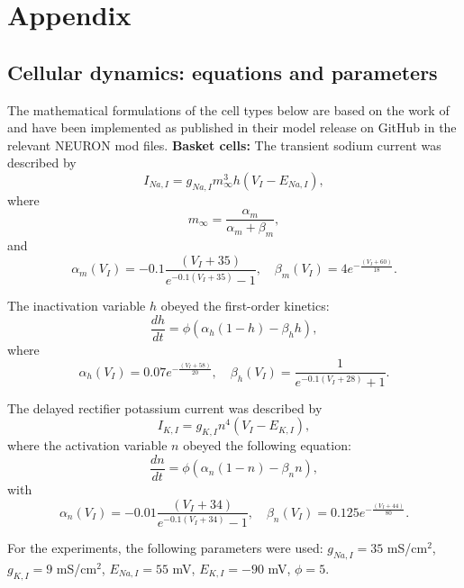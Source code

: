 \chapter{Appendix}\label{ch:appendix}
\section{Cellular dynamics: equations and parameters}
The mathematical formulations of the cell types below are based on the work of
\textcite{sanjayImpairedDendriticInhibition2015} and have been implemented as
published in their model release on GitHub in the relevant NEURON mod files.
\noindent \textbf{Basket cells:} The transient sodium current was described by
\[
    I_{Na,I} = g_{Na,I} m_{\infty}^3 h (V_I - E_{Na,I}),
\]
where
\[
    m_{\infty} = \frac{\alpha_m}{\alpha_m + \beta_m},
\]
and
\[
    \alpha_m(V_I) = -0.1 \frac{(V_I + 35)}{e^{-0.1(V_I+35)} - 1}, \quad \beta_m(V_I) = 4e^{-\frac{(V_I+60)}{18}}.
\]

The inactivation variable \( h \) obeyed the first-order kinetics:
\[
    \frac{dh}{dt} = \phi(\alpha_h (1 - h) - \beta_h h),
\]
where
\[
    \alpha_h(V_I) = 0.07 e^{-\frac{(V_I+58)}{20}}, \quad \beta_h(V_I) = \frac{1}{e^{- 0.1(V_I+28)} + 1}.
\]

The delayed rectifier potassium current was described by
\[
    I_{K,I} = g_{K,I} n^4 (V_I - E_{K,I}),
\]
where the activation variable \( n \) obeyed the following equation:
\[
    \frac{dn}{dt} = \phi(\alpha_n (1 - n) - \beta_n n),
\]
with
\[
    \alpha_n(V_I) = -0.01 \frac{(V_I + 34)}{e^{-0.1(V_I+34)} - 1}, \quad \beta_n(V_I) = 0.125 e^{-\frac{(V_I+44)}{80}}.
\]

For the experiments, the following parameters were used: \( g_{Na,I} = 35 \)
mS/cm\(^2\), \( g_{K,I} = 9 \) mS/cm\(^2\), \( E_{Na,I} = 55 \) mV, \( E_{K,I}
= -90 \) mV, \( \phi = 5 \).\pagebreak

